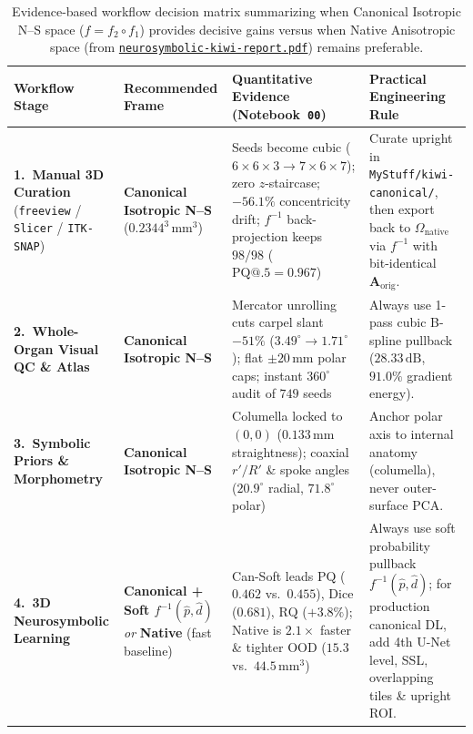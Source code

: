 \documentclass[10pt,a4paper]{article}
\renewcommand{\_}{\origunderscore\allowbreak}
\newcommand{\ghblob}{https://github.com/arvidl/BMED365-2027/blob/main}
\newcommand{\repodir}{Lab4-Comp-Imag/Kiwi-challenge/docs/neurosymbolic-report}
\newcommand{\natrep}{\href{\ghblob/\repodir/neurosymbolic-kiwi-report.pdf}{\texttt{neurosymbolic-\allowbreak kiwi-\allowbreak report.pdf}}}
\begin{document}
\begin{table}[htbp]
\centering
\caption[Task-specific decision matrix: Native vs.\ Canonical representation]{Evidence-based workflow decision matrix summarizing when Canonical Isotropic N--S space ($f = f_2 \circ f_1$) provides decisive gains versus when Native Anisotropic space (from \natrep{}) remains preferable.}
\label{tab:decision_matrix}
{\scriptsize
\setlength{\tabcolsep}{3.5pt}
\renewcommand{\arraystretch}{1.25}
\begin{tabularx}{\textwidth}{L{2.75cm} L{2.8cm} L{5.0cm} Y}
\toprule
{}\textbf{Workflow Stage} & \textbf{Recommended Frame} & \textbf{Quantitative Evidence (Notebook~\texttt{00})} & \textbf{Practical Engineering Rule} \\
\midrule
\textbf{1.\ Manual 3D Curation} (\texttt{freeview} / \texttt{Slicer} / \texttt{ITK-SNAP}) & \textbf{Canonical Isotropic N--S} ($0.2344^3\,\text{mm}^3$) & Seeds become cubic ($6{\times}6{\times}3 \to 7{\times}6{\times}7$); zero $z$-staircase; $-56.1\%$ concentricity drift; $f^{-1}$ back-projection keeps $98/98$ ($\text{PQ@.5}=0.967$) & Curate upright in \texttt{MyStuff/kiwi-canonical/}, then export back to $\Omega_{\text{native}}$ via $f^{-1}$ with bit-identical $\mathbf{A}_{\text{orig}}$. \\
\textbf{2.\ Whole-Organ Visual QC \& Atlas} & \textbf{Canonical Isotropic N--S} & Mercator unrolling cuts carpel slant $-51\%$ ($3.49^\circ \to 1.71^\circ$); flat $\pm 20\,\text{mm}$ polar caps; instant $360^\circ$ audit of $749$ seeds & Always use 1-pass cubic B-spline pullback ($28.33\,\text{dB}$, $91.0\%$ gradient energy). \\
\textbf{3.\ Symbolic Priors \& Morphometry} & \textbf{Canonical Isotropic N--S} & Columella locked to $(0,0)$ ($0.133\,\text{mm}$ straightness); coaxial $r'/R'$ \& spoke angles ($20.9^\circ$ radial, $71.8^\circ$ polar) & Anchor polar axis to internal anatomy (columella), never outer-surface PCA. \\
\textbf{4.\ 3D Neurosymbolic Learning} & \textbf{Canonical + Soft $f^{-1}(\hat{p},\hat{d})$} \textit{or} \textbf{Native} (fast baseline) & Can-Soft leads $\text{PQ}$ ($0.462$ vs.\ $0.455$), $\text{Dice}$ ($0.681$), $\text{RQ}$ ($+3.8\%$); Native is $2.1\times$ faster \& tighter OOD ($15.3$ vs.\ $44.5\,\text{mm}^3$) & Always use soft probability pullback $f^{-1}(\hat{p},\hat{d})$; for production canonical DL, add 4th U-Net level, SSL, overlapping tiles \& upright ROI. \\
\bottomrule
\end{tabularx}
}
\end{table}
\end{document}
